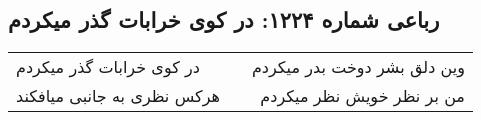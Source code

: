 \begin{center}
\section*{رباعی شماره ۱۲۲۴: در کوی خرابات گذر میکردم}
\label{sec:1224}
\begin{longtable}{l p{0.5cm} r}
در کوی خرابات گذر میکردم
&&
وین دلق بشر دوخت بدر میکردم
\\
هرکس نظری به جانبی میافکند
&&
من بر نظر خویش نظر میکردم
\\
\end{longtable}
\end{center}
